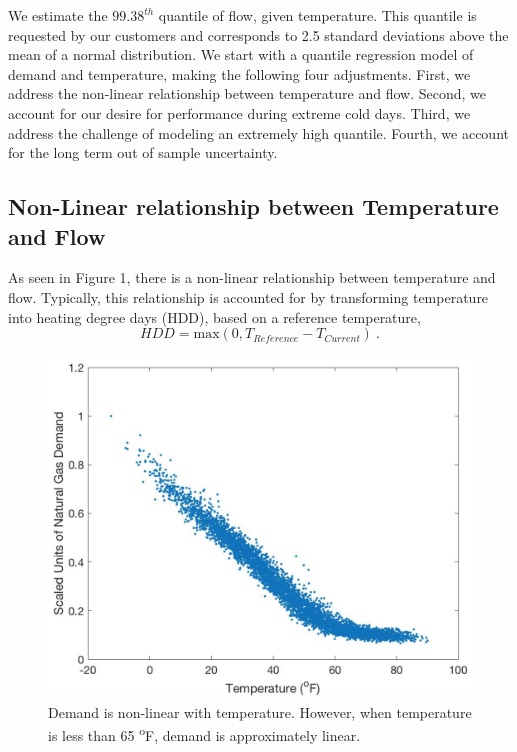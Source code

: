 \documentclass{article}
\begin{document}
We estimate the $99.38^{th}$ quantile of flow, given temperature. This quantile is requested by our customers and corresponds to 2.5 standard deviations above the mean of a normal distribution. We start with a quantile regression model of demand and temperature, making the following four adjustments. First, we address the non-linear relationship between temperature and flow. Second, we account for our desire for performance during extreme cold days. Third, we address the challenge of modeling an extremely high quantile. Fourth, we account for the long term out of sample uncertainty.

\subsection{Non-Linear relationship between Temperature and Flow}

As seen in Figure 1, there is a non-linear relationship between temperature and flow. Typically, this relationship is accounted for by transforming temperature into heating degree days (HDD), based on a reference temperature, 
\begin{equation}
    HDD= \mbox{max}(0, T_{Reference}-T_{Current})~.
    \label{eqn:hdd}
\end{equation}

\begin{figure} \label{fig:scatterTempAndFlow}
	\centering
	\includegraphics[scale=0.4]{nonlinear.png}
	\caption{Demand is non-linear with temperature. However, when temperature is less than 65 \textsuperscript{o}F, demand is approximately linear.}
\end{figure}
\end{document}
